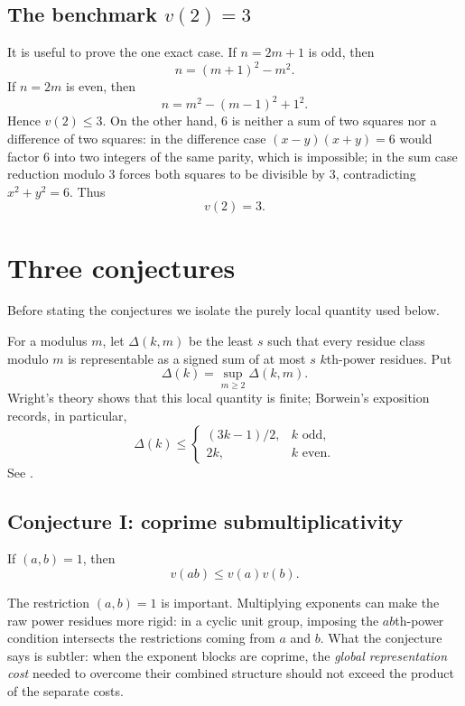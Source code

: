 \documentclass[../../Axiomathic.tex]{subfiles}
\begin{document}
\subsection{The benchmark $v(2)=3$}

It is useful to prove the one exact case.  If $n=2m+1$ is odd, then
\[
  n=(m+1)^2-m^2.
\]
If $n=2m$ is even, then
\[
  n=m^2-(m-1)^2+1^2.
\]
Hence $v(2)\le3$.  On the other hand, $6$ is neither a sum of two squares nor a difference of two squares: in the difference case $(x-y)(x+y)=6$ would factor $6$ into two integers of the same parity, which is impossible; in the sum case reduction modulo $3$ forces both squares to be divisible by $3$, contradicting $x^2+y^2=6$.  Thus
\[
  \boxed{v(2)=3.}
\]


\section{Three conjectures}

Before stating the conjectures we isolate the purely local quantity used below.

\begin{defn}
For a modulus $m$, let $\Delta(k,m)$ be the least $s$ such that every residue class modulo $m$ is representable as a signed sum of at most $s$ $k$th-power residues.  Put
\[
  \Delta(k)=\sup_{m\ge2}\Delta(k,m).
\]
Wright's theory shows that this local quantity is finite; Borwein's exposition records, in particular,
\[
  \Delta(k)\le
  \begin{cases}
    (3k-1)/2,&k\text{ odd},\\
    2k,&k\text{ even}.
  \end{cases}
\]
See \cite[Sec.~4.1]{Borwein2002}.
\end{defn}

\subsection{Conjecture I: coprime submultiplicativity}

\begin{conj}\label{conj:coprime}
If $(a,b)=1$, then
\begin{equation}\label{eq:coprime-submult}
  \boxed{v(ab)\le v(a)v(b).}
\end{equation}
\end{conj}

The restriction $(a,b)=1$ is important.  Multiplying exponents can make the raw power residues more rigid: in a cyclic unit group, imposing the $ab$th-power condition intersects the restrictions coming from $a$ and $b$.  What the conjecture says is subtler: when the exponent blocks are coprime, the \emph{global representation cost} needed to overcome their combined structure should not exceed the product of the separate costs.
\end{document}
